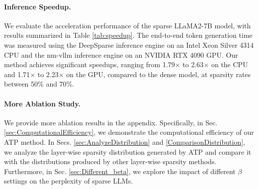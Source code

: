\paragraph{Inference Speedup.} We evaluate the acceleration performance of the sparse LLaMA2-7B model, with results summarized in Table \ref{tab:speedup}. The end-to-end token generation time was measured using the DeepSparse \citep{deepsparse} inference engine on an Intel Xeon Silver 4314 CPU and the nm-vllm \citep{nm-vllm} inference engine on an NVIDIA RTX 4090 GPU. Our method achieves significant speedups, ranging from 1.79$\times$ to 2.63$\times$ on the CPU and 1.71$\times$ to 2.23$\times$ on the GPU, compared to the dense model, at sparsity rates between 50$\%$ and 70$\%$.
\begin{table}[h!]
\centering
\caption{End-to-end inference acceleration of sparse LLaMA2-7B on CPU and GPU.}
\label{tab:speedup}
\setlength{\tabcolsep}{10pt}
\end{table}

\paragraph{More Ablation Study.} We provide more ablation results in the appendix. Specifically, in Sec. \ref{sec:ComputationalEfficiency}, we demonstrate the computational efficiency of our ATP method. In Secs. \ref{sec:AnalyzeDistribution} and \ref{ComparisonDistribution}, we analyze the layer-wise sparsity distribution generated by ATP and compare it with the distributions produced by other layer-wise sparsity methods. Furthermore, in Sec. \ref{sec:Different_beta}, we explore the impact of different $\beta$ settings on the perplexity of sparse LLMs.